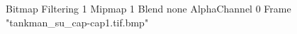 {Bitmap
	{Filtering 1}
	{Mipmap 1}
	{Blend none}
	{AlphaChannel 0}
	{Frame "tankman_su_cap-cap1.tif.bmp"}
}

